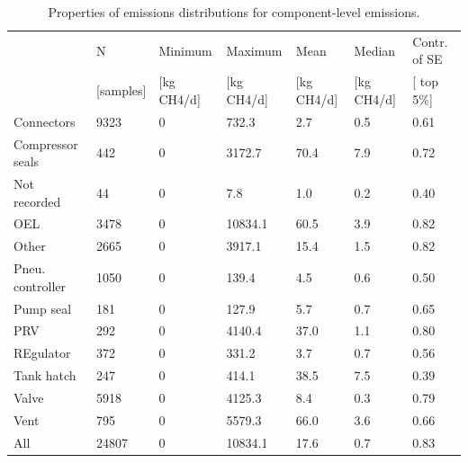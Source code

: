 \documentclass[11pt]{report}
\begin{document}
{{{{\begin{table}
\begin{scriptsize}
\caption{Properties of emissions distributions for component-level emissions.}
\label{tab:emission_dist_component}
\begin{tabular*}{1\columnwidth}{llllllp{}}
\toprule
			&	N                     & Minimum               & Maximum            & Mean           & Median         & Contr. of SE                                 \\
                     	 & {[}samples{]} & {[}kg CH4/d{]} & {[}kg CH4/d{]} & {[}kg CH4/d{]} & {[}kg CH4/d{]}                   & {[} top 5\%{]} \\
	 \midrule
Connectors       & 9323  & 0   & 732.3   & 2.7    & 0.5                  & 0.61 \\
Compressor seals & 442   & 0   & 3172.7  & 70.4   & 7.9                  & 0.72 \\
Not recorded     & 44    & 0   & 7.8     & 1.0    & 0.2                  & 0.40 \\
OEL              & 3478  & 0   & 10834.1 & 60.5   & 3.9                  & 0.82 \\
Other            & 2665  & 0   & 3917.1  & 15.4   & 1.5                  & 0.82 \\
Pneu. controller & 1050  & 0   & 139.4   & 4.5    & 0.6                  & 0.50 \\
Pump seal        & 181   & 0   & 127.9   & 5.7    & 0.7                  & 0.65 \\
PRV              & 292   & 0   & 4140.4  & 37.0   & 1.1                  & 0.80 \\
REgulator        & 372   & 0   & 331.2   & 3.7    & 0.7                  & 0.56 \\
Tank hatch       & 247   & 0   & 414.1   & 38.5   & 7.5                  & 0.39 \\
Valve            & 5918  & 0   & 4125.3  & 8.4    & 0.3                  & 0.79 \\
Vent             & 795   & 0   & 5579.3  & 66.0   & 3.6                  & 0.66 \\
All              & 24807 & 0   & 10834.1 & 17.6   & 0.7                  & 0.83\\
\bottomrule
\end{tabular*}
\end{scriptsize}
\end{table}





}}}}
\end{document}
